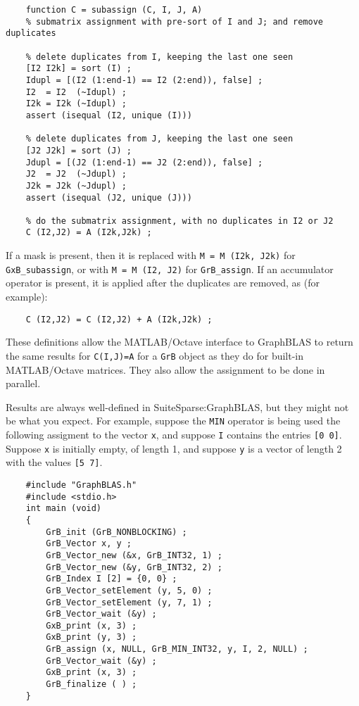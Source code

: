 \documentclass[12pt]{article}
\begin{document}
{\small
\begin{verbatim}
    function C = subassign (C, I, J, A)
    % submatrix assignment with pre-sort of I and J; and remove duplicates

    % delete duplicates from I, keeping the last one seen
    [I2 I2k] = sort (I) ;
    Idupl = [(I2 (1:end-1) == I2 (2:end)), false] ;
    I2  = I2  (~Idupl) ;
    I2k = I2k (~Idupl) ;
    assert (isequal (I2, unique (I)))

    % delete duplicates from J, keeping the last one seen
    [J2 J2k] = sort (J) ;
    Jdupl = [(J2 (1:end-1) == J2 (2:end)), false] ;
    J2  = J2  (~Jdupl) ;
    J2k = J2k (~Jdupl) ;
    assert (isequal (J2, unique (J)))

    % do the submatrix assignment, with no duplicates in I2 or J2
    C (I2,J2) = A (I2k,J2k) ;
\end{verbatim}}

If a mask is present, then it is replaced with \verb'M = M (I2k, J2k)' for
\verb'GxB_subassign', or with \verb'M = M (I2, J2)' for \verb'GrB_assign'.
If an accumulator operator is present, it is applied after the duplicates
are removed, as (for example):

{\small
\begin{verbatim}
    C (I2,J2) = C (I2,J2) + A (I2k,J2k) ;
\end{verbatim}}

These definitions allow the MATLAB/Octave interface to GraphBLAS to return the same
results for \verb'C(I,J)=A' for a \verb'GrB' object as they do for built-in
MATLAB/Octave matrices.  They also allow the assignment to be done in parallel.

Results are always well-defined in SuiteSparse:GraphBLAS, but they might not be
what you expect.  For example, suppose the \verb'MIN' operator is being used
the following assigment to the vector \verb'x', and suppose \verb'I' contains
the entries \verb'[0 0]'.  Suppose \verb'x' is initially empty, of length 1,
and suppose \verb'y' is a vector of length 2 with the values \verb'[5 7]'.

{\small
\begin{verbatim}
    #include "GraphBLAS.h"
    #include <stdio.h>
    int main (void)
    {
        GrB_init (GrB_NONBLOCKING) ;
        GrB_Vector x, y ;
        GrB_Vector_new (&x, GrB_INT32, 1) ;
        GrB_Vector_new (&y, GrB_INT32, 2) ;
        GrB_Index I [2] = {0, 0} ;
        GrB_Vector_setElement (y, 5, 0) ;
        GrB_Vector_setElement (y, 7, 1) ;
        GrB_Vector_wait (&y) ;
        GxB_print (x, 3) ;
        GxB_print (y, 3) ;
        GrB_assign (x, NULL, GrB_MIN_INT32, y, I, 2, NULL) ;
        GrB_Vector_wait (&y) ;
        GxB_print (x, 3) ;
        GrB_finalize ( ) ;
    }
\end{verbatim}}
\end{document}
